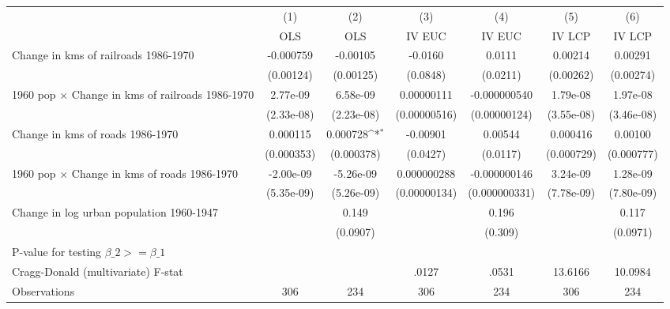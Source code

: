 {
\def\sym#1{\ifmmode^{#1}\else\(^{#1}\)\fi}
\begin{tabular}{l*{6}{c}}
\hline\hline
                &\multicolumn{1}{c}{(1)}&\multicolumn{1}{c}{(2)}&\multicolumn{1}{c}{(3)}&\multicolumn{1}{c}{(4)}&\multicolumn{1}{c}{(5)}&\multicolumn{1}{c}{(6)}\\
                &\multicolumn{1}{c}{OLS}&\multicolumn{1}{c}{OLS}&\multicolumn{1}{c}{IV EUC}&\multicolumn{1}{c}{IV EUC}&\multicolumn{1}{c}{IV LCP}&\multicolumn{1}{c}{IV LCP}\\
\hline
Change in kms of railroads 1986-1970&-0.000759         & -0.00105         &  -0.0160         &   0.0111         &  0.00214         &  0.00291         \\
                &(0.00124)         &(0.00125)         & (0.0848)         & (0.0211)         &(0.00262)         &(0.00274)         \\
[1em]
1960 pop $\times$ Change in kms of railroads 1986-1970& 2.77e-09         & 6.58e-09         &0.00000111         &-0.000000540         & 1.79e-08         & 1.97e-08         \\
                &(2.33e-08)         &(2.23e-08)         &(0.00000516)         &(0.00000124)         &(3.55e-08)         &(3.46e-08)         \\
[1em]
Change in kms of roads 1986-1970& 0.000115         & 0.000728\sym{*}  & -0.00901         &  0.00544         & 0.000416         &  0.00100         \\
                &(0.000353)         &(0.000378)         & (0.0427)         & (0.0117)         &(0.000729)         &(0.000777)         \\
[1em]
1960 pop $\times$ Change in kms of roads 1986-1970&-2.00e-09         &-5.26e-09         &0.000000288         &-0.000000146         & 3.24e-09         & 1.28e-09         \\
                &(5.35e-09)         &(5.26e-09)         &(0.00000134)         &(0.000000331)         &(7.78e-09)         &(7.80e-09)         \\
[1em]
Change in log urban population 1960-1947&                  &    0.149         &                  &    0.196         &                  &    0.117         \\
                &                  & (0.0907)         &                  &  (0.309)         &                  & (0.0971)         \\
\hline
P-value for testing $\beta\_{2} >= \beta\_{1}$&                  &                  &                  &                  &                  &                  \\
Cragg-Donald (multivariate) F-stat&                  &                  &    .0127         &    .0531         &  13.6166         &  10.0984         \\
Observations    &      306         &      234         &      306         &      234         &      306         &      234         \\
\hline\hline
\end{tabular}
}
